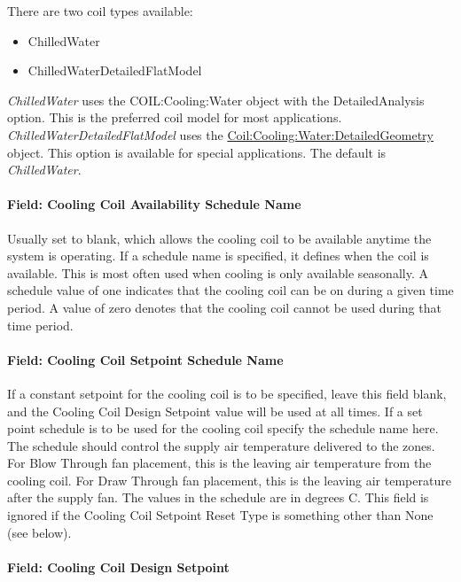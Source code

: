 There are two coil types available:

\begin{itemize}
\item
  ChilledWater
\item
  ChilledWaterDetailedFlatModel
\end{itemize}

\emph{ChilledWater} uses the COIL:Cooling:Water object with the DetailedAnalysis option. This is the preferred coil model for most applications. \emph{ChilledWaterDetailedFlatModel} uses the \hyperref[coilcoolingwaterdetailedgeometry]{Coil:Cooling:Water:DetailedGeometry} object. This option is available for special applications. The default is \emph{ChilledWater}.

\paragraph{Field: Cooling Coil Availability Schedule Name}\label{field-cooling-coil-availability-schedule-name-7}

Usually set to blank, which allows the cooling coil to be available anytime the system is operating. If a schedule name is specified, it defines when the coil is available. This is most often used when cooling is only available seasonally. A schedule value of one indicates that the cooling coil can be on during a given time period. A value of zero denotes that the cooling coil cannot be used during that time period.

\paragraph{Field: Cooling Coil Setpoint Schedule Name}\label{field-cooling-coil-setpoint-schedule-name}

If a constant setpoint for the cooling coil is to be specified, leave this field blank, and the Cooling Coil Design Setpoint value will be used at all times. If a set point schedule is to be used for the cooling coil specify the schedule name here. The schedule should control the supply air temperature delivered to the zones. For Blow Through fan placement, this is the leaving air temperature from the cooling coil. For Draw Through fan placement, this is the leaving air temperature after the supply fan. The values in the schedule are in degrees C. This field is ignored if the Cooling Coil Setpoint Reset Type is something other than None (see below).

\paragraph{Field: Cooling Coil Design Setpoint}\label{field-cooling-coil-design-setpoint-1}

